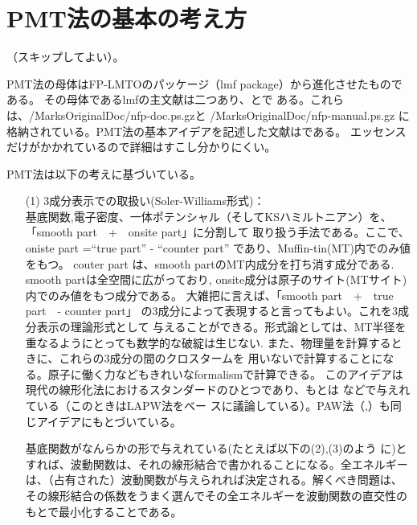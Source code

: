 \documentclass[twocolumn,showpacs,preprintnumbers,amsmath,amssymb,floatfix]{revtex4-1}
\begin{document}
\section{PMT法の基本の考え方}
（スキップしてよい）。

PMT法の母体はFP-LMTOのパッケージ（lmf package）から進化させたものである。
その母体であるlmfの主文献は二つあり、\cite{lmfchap}と\cite{nfpmanual}で
ある。これらは、/MarksOriginalDoc/nfp-doc.ps.gzと
/MarksOriginalDoc/nfp-manual.ps.gz
に格納されている。PMT法の基本アイデアを記述した文献は\cite{pmt1}である。
エッセンスだけがかかれているので詳細はすこし分かりにくい。

PMT法は以下の考えに基づいている。
\begin{itemize}
\item[(1)]
3成分表示での取扱い(Soler-Williams形式)：\\
基底関数,電子密度、一体ポテンシャル（そしてKSハミルトニアン）を、
「smooth part　+　onsite part」に分割して
取り扱う手法である。ここで、oniste part =``true part'' - ``counter part''
であり、Muffin-tin(MT)内でのみ値をもつ。
couter part は、smooth partのMT内成分を打ち消す成分である.
smooth partは全空間に広がっており,
onsite成分は原子のサイト(MTサイト)内でのみ値をもつ成分である。
大雑把に言えば、「smooth part　+　true part　- counter part」
の3成分によって表現すると言ってもよい。これを3成分表示の理論形式として
与えることができる。形式論としては、MT半径を重なるようにとっても数学的な破綻は生じない.
また、物理量を計算するときに、これらの3成分の間のクロスタームを
用いないで計算することになる。原子に働く力などもきれいなformalismで計算できる。
このアイデアは現代の線形化法におけるスタンダードのひとつであり、もとは
\cite{soler89}などで与えれている（このときはLAPW法をベー
スに議論している）。PAW法（\cite{PAW},\cite{kresse99}）も同じアイデアにもとづいている。

基底関数がなんらかの形で与えれている(たとえば以下の(2),(3)のよう
に)とすれば、波動関数は、それの線形結合で書かれることになる。全エネルギー
は、（占有された）波動関数が与えられれば決定される。解くべき問題は、
その線形結合の係数をうまく選んでその全エネルギーを波動関数の直交性のもとで最小化することである。




\end{itemize}
\end{document}
